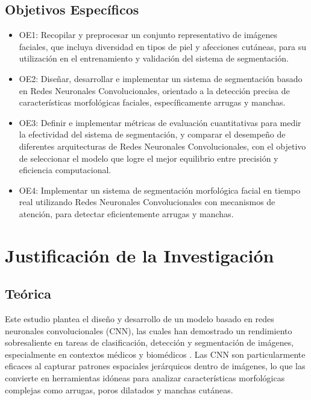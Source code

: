 \subsection{Objetivos Específicos}
\newcommand{\Objone}{
Recopilar y preprocesar un conjunto representativo de imágenes faciales, que incluya diversidad en tipos de piel y afecciones cutáneas, para su utilización en el entrenamiento y validación del sistema de segmentación.
}

\newcommand{\Objtwo}{
Diseñar, desarrollar e implementar un sistema de segmentación basado en Redes Neuronales Convolucionales, orientado a la detección precisa de características morfológicas faciales, específicamente arrugas y manchas.
}

\newcommand{\Objthree}{
Definir e implementar métricas de evaluación cuantitativas para medir la efectividad del sistema de segmentación, y comparar el desempeño de diferentes arquitecturas de Redes Neuronales Convolucionales, con el objetivo de seleccionar el modelo que logre el mejor equilibrio entre precisión y eficiencia computacional.
}
\newcommand{\Objfour}{
Implementar un sistema de segmentación morfológica facial en tiempo real utilizando Redes Neuronales Convolucionales con mecanismos de atención, para detectar eficientemente arrugas y manchas.
}
\begin{itemize}
	\item OE1: {\Objone}
	\item OE2: {\Objtwo}
	\item OE3: {\Objthree}
	\item OE4: {\Objfour}
\end{itemize}


\section{Justificación de la Investigación}

\subsection{Teórica}

Este estudio plantea el diseño y desarrollo de un modelo basado en redes neuronales convolucionales (CNN), las cuales han demostrado un rendimiento sobresaliente en tareas de clasificación, detección y segmentación de imágenes, especialmente en contextos médicos y biomédicos \parencite{esteva2017}. Las CNN son particularmente eficaces al capturar patrones espaciales jerárquicos dentro de imágenes, lo que las convierte en herramientas idóneas para analizar características morfológicas complejas como arrugas, poros dilatados y manchas cutáneas.

